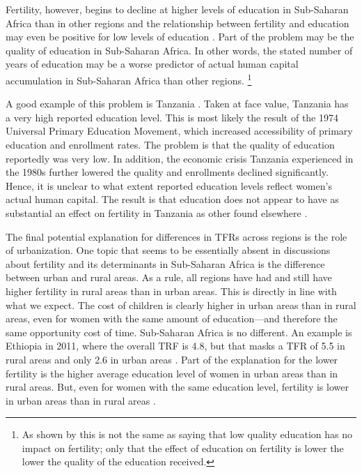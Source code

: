 \documentclass[letterpaper,12pt]{article}
\begin{document}
Fertility, however, begins to decline at higher levels of education in
Sub-Saharan Africa than in other regions and the relationship between
fertility and education may even be positive for low levels of education
\citep{Ainsworth1996,Benefo1996,Thomas1996}.
Part of the problem may be the quality of education in Sub-Saharan
Africa.
In other words, the stated number of years of education may be a worse
predictor of actual human capital accumulation in Sub-Saharan Africa
than other regions.%
\footnote{
As shown by \citet{Oye2016} this is not the same as saying that low
quality education has no impact on fertility; only that the effect
of education on fertility is lower the lower the quality of the
education received.
}

A good example of this problem is Tanzania
\citep{Galabawa2001,Wedgwood2005}.
Taken at face value, Tanzania has a very high reported education level.
This is most likely the result of the 1974 Universal Primary Education
Movement, which increased accessibility of primary education and
enrollment rates.
The problem is that the quality of education reportedly was very low.
In addition, the economic crisis Tanzania experienced in the 1980s
further lowered the quality and enrollments declined significantly.
Hence, it is unclear to what extent reported education levels reflect
women's actual human capital.
The result is that education does not appear to have as substantial an
effect on fertility in Tanzania as other found elsewhere
\citep{Alam2016}.



The final potential explanation for differences in TFRs across regions 
is the role of urbanization.
One topic that seems to be essentially absent in discussions about
fertility and its determinants in Sub-Saharan Africa is the difference
between urban and rural areas.
As a rule, all regions have had and still have higher fertility in rural
areas than in urban areas.
This is directly in line with what we expect.
The cost of children is clearly higher in urban areas than in rural
areas, even for women with the same amount of education---and therefore
the same opportunity cost of time.
Sub-Saharan Africa is no different.
An example is Ethiopia in 2011, where the overall TRF is 4.8, but that
masks a TFR of 5.5 in rural areas and only 2.6 in urban areas
\citep{Central-Statistical-Agency/Ethiopia2012}.
Part of the explanation for the lower fertility is the higher average
education level of women in urban areas than in rural areas.
But, even for women with the same education level, fertility is lower in
urban areas than in rural areas \citep{Ainsworth1996}.
\end{document}
